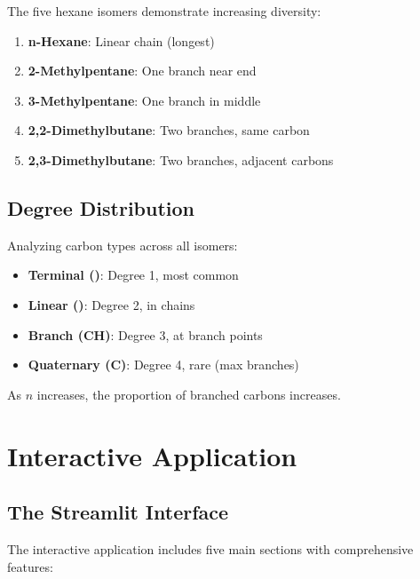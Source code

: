 \documentclass[conference]{IEEEtran}
\begin{document}
The five hexane isomers demonstrate increasing diversity:

\begin{enumerate}
    \item \textbf{n-Hexane}: Linear chain (longest)
    \item \textbf{2-Methylpentane}: One branch near end
    \item \textbf{3-Methylpentane}: One branch in middle
    \item \textbf{2,2-Dimethylbutane}: Two branches, same carbon
    \item \textbf{2,3-Dimethylbutane}: Two branches, adjacent carbons
\end{enumerate}

\subsection{Degree Distribution}

Analyzing carbon types across all isomers:

\begin{itemize}
    \item \textbf{Terminal ()}: Degree 1, most common
    \item \textbf{Linear ()}: Degree 2, in chains
    \item \textbf{Branch (CH)}: Degree 3, at branch points
    \item \textbf{Quaternary (C)}: Degree 4, rare (max branches)
\end{itemize}

As $n$ increases, the proportion of branched carbons increases.

\section{Interactive Application}

\subsection{The Streamlit Interface}

The interactive application includes five main sections with comprehensive features:
\end{document}
